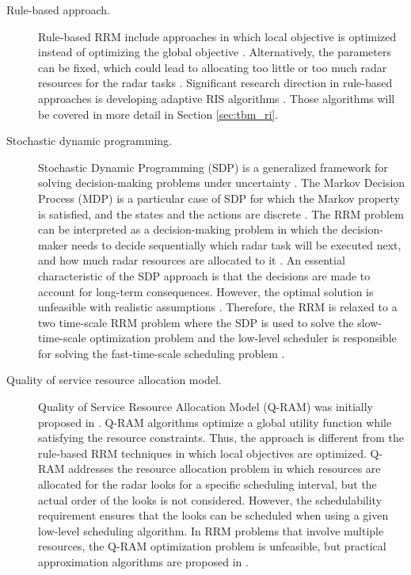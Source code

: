 \documentclass[english, 12pt, a4paper, elec, utf8, a-1b, online]{aaltothesis}
\numberwithin{equation}{section}
\begin{document}
\begin{description}

\item[Rule-based approach.]

Rule-based RRM include approaches in which local objective is optimized instead of optimizing the global objective \cite{Koch1999}.
Alternatively, the parameters can be fixed, which could lead to allocating too little or too much radar resources for the radar tasks \cite{Hoffmann2014}.
Significant research direction in rule-based approaches is developing adaptive RIS algorithms \cite{Cohen1986, Gardner1988, Munu1992, ChengTing2007, Baek2010, Watson1993, Charlish2015, Keuk1975, Shin1995, Benoudnine2006}. Those algorithms will be covered in more detail in Section \ref{sec:tbm_ri}.


\item[Stochastic dynamic programming.]

Stochastic Dynamic Programming (SDP) is a generalized framework for solving decision-making problems under uncertainty \cite{Ross1983}. 
The Markov Decision Process (MDP) is a particular case of SDP for which the Markov property is satisfied, and the states and the actions are discrete \cite{Ross1983}.
The RRM problem can be interpreted as a decision-making problem in which the decision-maker needs to decide sequentially which radar task will be executed next, and how much radar resources are allocated to it \cite{Krishnamurthy2001, Wintenby2006, LaScala2006}.
An essential characteristic of the SDP approach is that the decisions are made to account for long-term consequences.
However, the optimal solution is unfeasible with realistic assumptions \cite{Wintenby2006}.
Therefore, the RRM is relaxed to a two time-scale RRM problem where the SDP is used to solve the slow-time-scale optimization problem and the low-level scheduler is responsible for solving the fast-time-scale scheduling problem \cite{Wintenby2006}.  


\item[Quality of service resource allocation model.] 

Quality of Service Resource Allocation Model (Q-RAM) was initially proposed in \cite{Rajkumar1997}.
Q-RAM algorithms optimize a global utility function while satisfying the resource constraints.
Thus, the approach is different from the rule-based RRM techniques in which local objectives are optimized.
Q-RAM addresses the resource allocation problem in which resources are allocated for the radar looks for a specific scheduling interval, but the actual order of the looks is not considered.
However, the schedulability requirement ensures that the looks can be scheduled when using a given low-level scheduling algorithm. 
In RRM problems that involve multiple resources, the Q-RAM optimization problem is unfeasible, but practical approximation algorithms are proposed in \cite{Rajkumar1998, Irci2010, Charlish2015a}.


\end{description}
\end{document}
